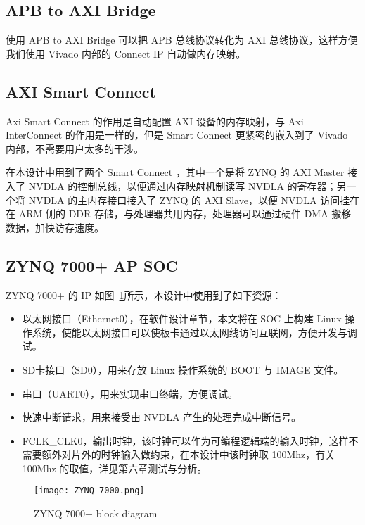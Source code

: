 \subsection{APB to AXI Bridge}

使用 APB to AXI Bridge 可以把 APB 总线协议转化为 AXI 总线协议，这样方便我们使用 Vivado 内部的 Connect IP 自动做内存映射。

\subsection{AXI Smart Connect}

Axi Smart Connect 的作用是自动配置 AXI 设备的内存映射，与 Axi InterConnect 的作用是一样的，但是 Smart Connect 更紧密的嵌入到了 Vivado 内部，不需要用户太多的干涉。

在本设计中用到了两个 Smart Connect ，其中一个是将 ZYNQ 的 AXI Master 接入了 NVDLA 的控制总线，以便通过内存映射机制读写 NVDLA 的寄存器；另一个将 NVDLA 的主内存接口接入了 ZYNQ 的 AXI Slave，以便 NVDLA 访问挂在在 ARM 侧的 DDR 存储，与处理器共用内存，处理器可以通过硬件 DMA 搬移数据，加快访存速度。

\subsection{ZYNQ 7000+ AP SOC}

ZYNQ 7000+ 的 IP 如图~\ref{fig:ZYNQ 7000+}所示，本设计中使用到了如下资源：

\begin{itemize}
    \item 以太网接口（Ethernet0），在软件设计章节，本文将在 SOC 上构建 Linux 操作系统，使能以太网接口可以使板卡通过以太网线访问互联网，方便开发与调试。
    \item SD卡接口（SD0），用来存放 Linux 操作系统的 BOOT 与 IMAGE 文件。
    \item 串口（UART0），用来实现串口终端，方便调试。
    \item 快速中断请求，用来接受由 NVDLA 产生的处理完成中断信号。
    \item FCLK\_CLK0，输出时钟，该时钟可以作为可编程逻辑端的输入时钟，这样不需要额外对片外的时钟输入做约束，在本设计中该时钟取 100Mhz，有关 100Mhz 的取值，详见第六章测试与分析。
\end{itemize}

\begin{figure}[!htbp]
    \centering
    \texttt{[image: ZYNQ 7000.png]}
    \caption{ZYNQ 7000+ block diagram}
    \label{fig:ZYNQ 7000+}
\end{figure}










